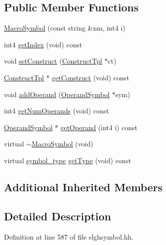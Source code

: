 \subsection*{Public Member Functions}
\begin{DoxyCompactItemize}
\item 
\mbox{\hyperlink{class_macro_symbol_a866aa0599e9e34c46b6692d50ae4d57e}{Macro\+Symbol}} (const string \&nm, int4 i)
\item 
int4 \mbox{\hyperlink{class_macro_symbol_ad4ecc16c5e76789e19dd9757f6167e98}{get\+Index}} (void) const
\item 
void \mbox{\hyperlink{class_macro_symbol_a0d6e88a0dd5314617733ed423a7e8c5f}{set\+Construct}} (\mbox{\hyperlink{class_construct_tpl}{Construct\+Tpl}} $\ast$ct)
\item 
\mbox{\hyperlink{class_construct_tpl}{Construct\+Tpl}} $\ast$ \mbox{\hyperlink{class_macro_symbol_aa1eba759ff6d0aa3a24709838847a7e3}{get\+Construct}} (void) const
\item 
void \mbox{\hyperlink{class_macro_symbol_aeb8d11b7c982396faac11ebbc9654941}{add\+Operand}} (\mbox{\hyperlink{class_operand_symbol}{Operand\+Symbol}} $\ast$sym)
\item 
int4 \mbox{\hyperlink{class_macro_symbol_a0b0cefad99fd10752c4c18acad7e2310}{get\+Num\+Operands}} (void) const
\item 
\mbox{\hyperlink{class_operand_symbol}{Operand\+Symbol}} $\ast$ \mbox{\hyperlink{class_macro_symbol_a82ff6faaa968d2c28269370a886420cc}{get\+Operand}} (int4 i) const
\item 
virtual \mbox{\hyperlink{class_macro_symbol_af02af2bfeffa2a804f94910d04d36865}{$\sim$\+Macro\+Symbol}} (void)
\item 
virtual \mbox{\hyperlink{class_sleigh_symbol_aba70f7f332fd63488c5ec4bd7807db41}{symbol\+\_\+type}} \mbox{\hyperlink{class_macro_symbol_af91e4932c105c106681633304083ffc4}{get\+Type}} (void) const
\end{DoxyCompactItemize}
\subsection*{Additional Inherited Members}


\subsection{Detailed Description}


Definition at line 587 of file slghsymbol.\+hh.



